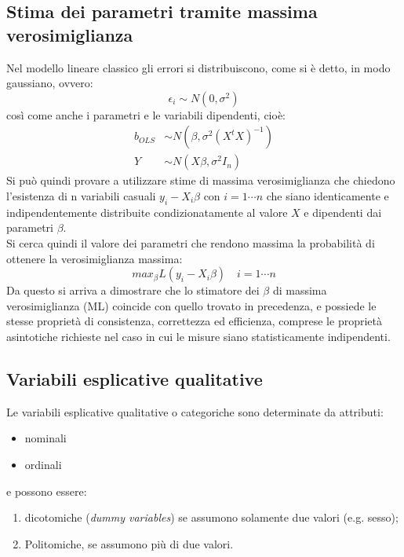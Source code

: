 \documentclass[]{article}
\begin{document}
\subsection{Stima dei parametri tramite massima verosimiglianza}
Nel modello lineare classico gli errori si distribuiscono, come si è detto, in modo gaussiano, ovvero:
\begin{equation}
\epsilon_i \sim N(0,\sigma^2)
\end{equation}
così come anche i parametri e le variabili dipendenti, cioè:
\begin{equation}
\begin{split}
b_{OLS} &\sim N(\beta, \sigma^2(X^tX)^{-1}) \\
Y &\sim N(X\beta, \sigma^2 I_n)
\end{split}
\end{equation}
Si può quindi provare a utilizzare stime di massima verosimiglianza che chiedono l'esistenza di n variabili casuali $y_i - X_i\beta$ con $i=1 \cdots n$ che siano identicamente e indipendentemente distribuite condizionatamente al valore $X$ e dipendenti dai parametri $\beta$.\\
Si cerca quindi il valore dei parametri che rendono massima la probabilità di ottenere la verosimiglianza massima:
\begin{equation}
max_\beta L(y_i - X_i\beta) \quad i=1 \cdots n
\end{equation}
Da questo si arriva a dimostrare che lo stimatore dei $\beta$ di massima verosimiglianza (ML) coincide con quello trovato in precedenza, e possiede le stesse proprietà di consistenza, correttezza ed efficienza, comprese le proprietà asintotiche richieste nel caso in cui le misure siano statisticamente indipendenti.

\subsection{Variabili esplicative qualitative}
Le variabili esplicative qualitative o categoriche sono determinate da attributi:
\begin{itemize}
\item nominali
\item ordinali
\end{itemize}
e possono essere:
\begin{enumerate}
\item dicotomiche (\textit{dummy variables}) se assumono solamente due valori (e.g. sesso);
\item Politomiche, se assumono più di due valori.
\end{enumerate}
\end{document}
